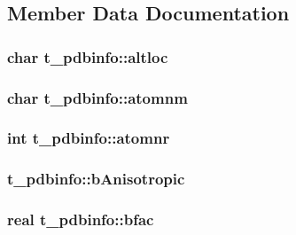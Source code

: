 \subsection{\-Member \-Data \-Documentation}
\hypertarget{structt__pdbinfo_a105f60fd503343184fc58f311e5d45f6}{
\subsubsection[{altloc}]{\setlength{\rightskip}{0pt plus 5cm}char {\bf t\-\_\-pdbinfo\-::altloc}}}\label{structt__pdbinfo_a105f60fd503343184fc58f311e5d45f6}
\hypertarget{structt__pdbinfo_a9896fa90ca0eb6d8ad2b218cbc800ee3}{
\subsubsection[{atomnm}]{\setlength{\rightskip}{0pt plus 5cm}char {\bf t\-\_\-pdbinfo\-::atomnm}}}\label{structt__pdbinfo_a9896fa90ca0eb6d8ad2b218cbc800ee3}
\hypertarget{structt__pdbinfo_abba7526af908e6c39889b1a06dc47cc6}{
\subsubsection[{atomnr}]{\setlength{\rightskip}{0pt plus 5cm}int {\bf t\-\_\-pdbinfo\-::atomnr}}}\label{structt__pdbinfo_abba7526af908e6c39889b1a06dc47cc6}
\hypertarget{structt__pdbinfo_a783a654e896ef07270f07495f1498fea}{
\subsubsection[{b\-Anisotropic}]{ {\bf t\-\_\-pdbinfo\-::b\-Anisotropic}}}\label{structt__pdbinfo_a783a654e896ef07270f07495f1498fea}
\hypertarget{structt__pdbinfo_a832bd8714d210370247bc434109269b9}{
\subsubsection[{bfac}]{\setlength{\rightskip}{0pt plus 5cm}real {\bf t\-\_\-pdbinfo\-::bfac}}}\label{structt__pdbinfo_a832bd8714d210370247bc434109269b9}
